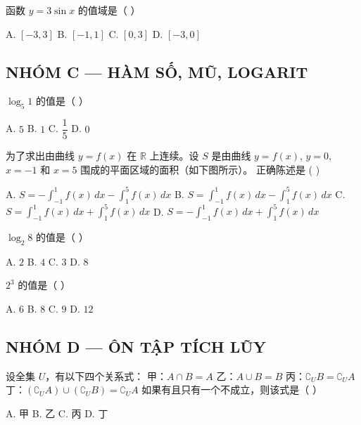\documentclass[11pt, a4paper]{article}
\begin{document}
\begin{baitap}[19]
函数 $y = 3\sin x$ 的值域是（ ）
\par\vspace{3pt}
\noindent A. $[-3, 3]$ \quad B. $[-1, 1]$ \quad C. $[0, 3]$ \quad D. $[-3, 0]$
\end{baitap}

\subsection*{NHÓM C — HÀM SỐ, MŨ, LOGARIT}

\begin{baitap}[20]
$\log_5 1$ 的值是（ ）
\par\vspace{3pt}
\noindent A. $5$ \quad B. $1$ \quad C. $\dfrac{1}{5}$ \quad D. $0$
\end{baitap}

\begin{baitap}[21]
为了求出由曲线 $y = f(x)$ 在 $\mathbb{R}$ 上连续。设 $S$ 是由曲线 $y = f(x)$, $y = 0$, $x = -1$ 和 $x = 5$ 围成的平面区域的面积（如下图所示）。 正确陈述是 ( )
\par\vspace{3pt}
\noindent A. $S = -\int_{-1}^{1} f(x)\,dx - \int_{1}^{5} f(x)\,dx$ \quad B. $S = \int_{-1}^{1} f(x)\,dx - \int_{1}^{5} f(x)\,dx$ \quad C. $S = \int_{-1}^{1} f(x)\,dx + \int_{1}^{5} f(x)\,dx$ \quad D. $S = -\int_{-1}^{1} f(x)\,dx + \int_{1}^{5} f(x)\,dx$
\end{baitap}

\begin{baitap}[22]
$\log_2 8$ 的值是（ ）
\par\vspace{3pt}
\noindent A. $2$ \quad B. $4$ \quad C. $3$ \quad D. $8$
\end{baitap}

\begin{baitap}[23]
$2^3$ 的值是（ ）
\par\vspace{3pt}
\noindent A. $6$ \quad B. $8$ \quad C. $9$ \quad D. $12$
\end{baitap}

\subsection*{NHÓM D — ÔN TẬP TÍCH LŨY}

\begin{baitap}[24]
设全集 $U$，有以下四个关系式： 甲：$A\cap B=A$ 乙：$A\cup B=B$ 丙：$\complement_U B=\complement_U A$ 丁：$(\complement_U A)\cup(\complement_U B)=\complement_U A$ 如果有且只有一个不成立，则该式是（ ）
\par\vspace{3pt}
\noindent A. 甲 \quad B. 乙 \quad C. 丙 \quad D. 丁
\end{baitap}
\end{document}
